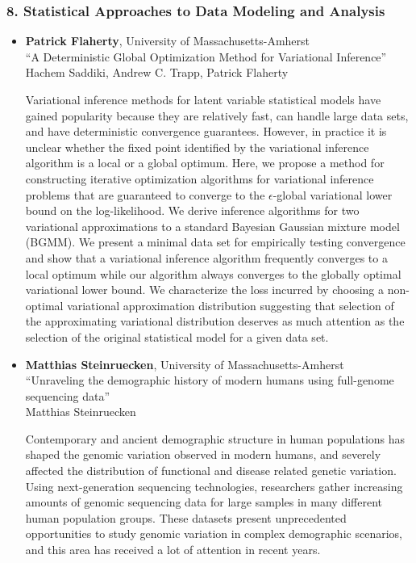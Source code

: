 \subsubsection*{8. Statistical Approaches to Data Modeling and Analysis}

\begin{itemize}
\item \textbf{Patrick Flaherty}, University of Massachusetts-Amherst \\
``A Deterministic Global Optimization Method for Variational Inference'' \\
Hachem Saddiki, Andrew C. Trapp, Patrick Flaherty


Variational inference methods for latent variable statistical models have gained popularity because they are relatively fast, can handle large data sets, and have deterministic convergence guarantees.
However, in practice it is unclear whether the fixed point identified by the variational inference algorithm is a local or a global optimum.
Here, we propose a method for constructing iterative optimization algorithms for variational inference problems that are guaranteed to converge to the $\epsilon$-global variational lower bound on the log-likelihood.
We derive inference algorithms for two variational approximations to a standard Bayesian Gaussian mixture model (BGMM).
We present a minimal data set for empirically testing convergence and show that a variational inference algorithm frequently converges to a local optimum while our algorithm always converges to the globally optimal variational lower bound.
We characterize the loss incurred by choosing a non-optimal variational approximation distribution suggesting that selection of the approximating variational distribution deserves as much attention as the selection of the original statistical model for a given data set.

\item \textbf{Matthias Steinruecken}, University of Massachusetts-Amherst \\
``Unraveling the demographic history of modern humans using full-genome sequencing data'' \\
Matthias Steinruecken


Contemporary and ancient demographic structure in human populations has shaped the genomic variation observed in modern humans, and severely affected the distribution of functional and disease related genetic variation. Using next-generation sequencing technologies, researchers gather increasing amounts of genomic sequencing data for large samples in many different human population groups. These datasets present unprecedented opportunities to study genomic variation in complex demographic scenarios, and this area has received a lot of attention in recent years.



\end{itemize}
